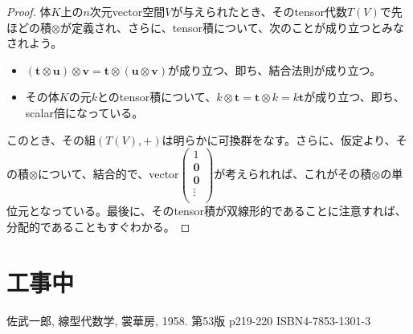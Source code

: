 \documentclass[dvipdfmx]{jsarticle}
\begin{document}
\begin{proof}
体$K$上の$n$次元vector空間$V$が与えられたとき、そのtensor代数$T(V)$で先ほどの積$\otimes$が定義され、さらに、tensor積について、次のことが成り立つとみなされよう。
\begin{itemize}
\item
  $\left( \mathbf{t} \otimes \mathbf{u} \right) \otimes \mathbf{v} = \mathbf{t} \otimes \left( \mathbf{u} \otimes \mathbf{v} \right)$が成り立つ、即ち、結合法則が成り立つ。
\item
  その体$K$の元$k$とのtensor積について、$k \otimes \mathbf{t} = \mathbf{t} \otimes k = k\mathbf{t}$が成り立つ、即ち、scalar倍になっている。
\end{itemize}
このとき、その組$\left( T(V), + \right)$は明らかに可換群をなす。さらに、仮定より、その積$\otimes$について、結合的で、vector$\begin{pmatrix}
1 \\
\mathbf{0} \\
\mathbf{0} \\
 \vdots \\
\end{pmatrix}$が考えられれば、これがその積$\otimes$の単位元となっている。最後に、そのtensor積が双線形的であることに注意すれば、分配的であることもすぐわかる。
\end{proof}
\section*{工事中}
\begin{thebibliography}{50}
  佐武一郎, 線型代数学, 裳華房, 1958. 第53版 p219-220 ISBN4-7853-1301-3
\end{thebibliography}
\end{document}
